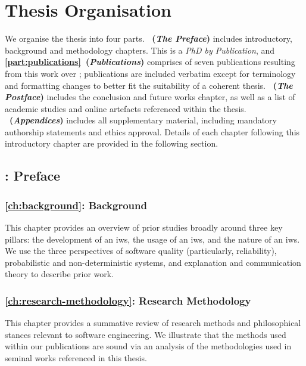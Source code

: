 \section{Thesis Organisation}
\label{sec:introduction:organisation}

We organise the thesis into four parts. \textbf{~(\textit{The Preface})} includes introductory, background and methodology chapters. This is a \textit{PhD by Publication}, and \textbf{\cref{part:publications}~(\textit{Publications})} comprises of seven publications resulting from this work over ; publications are included verbatim except for terminology and formatting changes to better fit the suitability of a coherent thesis. \textbf{~(\textit{The Postface})} includes the conclusion and future works chapter, as well as a list of academic studies and online artefacts referenced within the thesis. \textbf{~(\textit{Appendices})} includes all supplementary material, including mandatory authorship statements and ethics approval. Details of each chapter following this introductory chapter are provided in the following section.

\subsection{: Preface}

\subsubsection{\cref{ch:background}: Background} This chapter provides an overview of prior studies broadly around three key pillars: the development of an \gls{iws}, the usage of an \gls{iws}, and the nature of an \gls{iws}. We use the three perspectives of software quality (particularly, reliability), probabilistic and non-deterministic systems, and explanation and communication theory to describe prior work.

\subsubsection{\cref{ch:research-methodology}: Research Methodology} This chapter provides a summative review of research methods and philosophical stances relevant to software engineering. We illustrate that the methods used within our publications are sound via an analysis of the methodologies used in seminal works referenced in this thesis.

